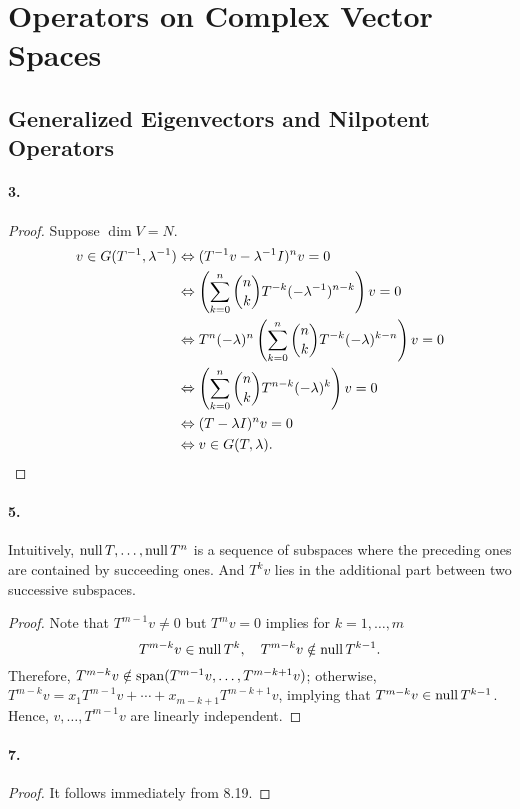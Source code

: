 \section{Operators on Complex Vector Spaces}
\subsection{Generalized Eigenvectors and Nilpotent Operators}
  \paragraph{3.}
  \begin{proof}
    Suppose $\dim V= N$. 
    \begin{align*}
      v\in G(T^{-1}, \lambda^{-1}) 
      &\Leftrightarrow (T^{-1} v-\lambda^{-1} I)^nv = 0 \\
      &\Leftrightarrow 
        \left(\sum_{k=0}^n\binom{n}{k}T^{-k}(-\lambda^{-1})^{n-k}\right)v=0 \\
      &\Leftrightarrow
        T^n(-\lambda)^n
        \left(\sum_{k=0}^n\binom{n}{k}T^{-k}(-\lambda)^{k-n}\right)v=0 \\
      &\Leftrightarrow
        \left(\sum_{k=0}^n\binom{n}{k}T^{n-k}(-\lambda)^{k}\right)v=0 \\
      &\Leftrightarrow (T-\lambda I)^nv = 0 \\
      &\Leftrightarrow v\in G(T,\lambda).
    \end{align*}
  \end{proof}

  \paragraph{5.}
    Intuitively, $\operatorname{null} T,\dots,\operatorname{null} T^n$ is a sequence of subspaces where the 
    preceding ones are contained by succeeding ones. And $T^{k}v$ lies in the 
    additional part between two successive subspaces.
  \begin{proof}
    Note that $T^{m-1}v\ne 0$ but $T^mv=0$ implies for $k=1,\dots,m$
    \[
      T^{m-k}v\in\operatorname{null} T^k,\quad T^{m-k}v\notin\operatorname{null} T^{k-1}.
    \]
    Therefore, $T^{m-k}v\notin\operatorname{span}(T^{m-1}v,\dots,T^{m-k+1}v)$; otherwise, 
    $T^{m-k}v=x_1T^{m-1}v+\cdots+x_{m-k+1}T^{m-k+1}v$, implying that $T^{m-k}v
    \in\operatorname{null} T^{k-1}$. Hence, $v, \dots, T^{m-1}v$ are linearly independent.
  \end{proof}

  \paragraph{7.}
  \begin{proof}
    It follows immediately from 8.19.
  \end{proof}

